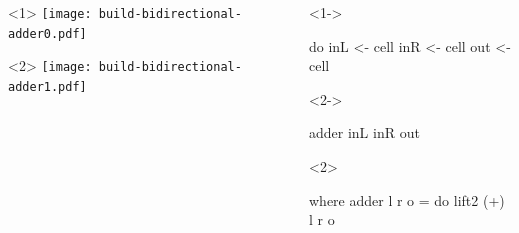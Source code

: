 \documentclass[UKenglish,usenames,dvipsnames,svgnames,table,aspectratio=169,mathserif]{beamer}
\newcommand{\nl}{\vspace{\baselineskip}}
\begin{document}
\begin{frame}[fragile]
\centering

\begin{columns}
\begin{column}{0.5\textwidth}
\nl
\begin{overlayarea}{0.5\textwidth}{0.4\textheight}
\begin{onlyenv}<1>
\texttt{[image: build-bidirectional-adder0.pdf]}
\end{onlyenv}
\begin{onlyenv}<2>
\texttt{[image: build-bidirectional-adder1.pdf]}
\end{onlyenv}
\end{overlayarea}
\end{column}

\begin{column}{0.5\textwidth}
\begin{overlayarea}{0.5\textwidth}{0.3\textheight}
\begin{onlyenv}<1->
\begin{haskellcode}
do
  inL  <- cell
  inR  <- cell
  out  <- cell
\end{haskellcode}
\end{onlyenv}
\nl
\begin{onlyenv}<2->
\begin{haskellcode}
  adder inL inR out
\end{haskellcode}
\end{onlyenv}
\end{overlayarea}

\begin{overlayarea}{0.5\textwidth}{0.3\textheight}
\begin{onlyenv}<2>
\begin{haskellcode}
    where
      adder l r o = do
        lift2 (+) l r o
\end{haskellcode}
\end{onlyenv}
\end{overlayarea}
\end{column}

\end{columns}
\end{frame}
\end{document}
